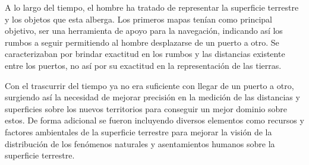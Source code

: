 A lo largo del tiempo, el hombre ha tratado de representar la superficie terrestre y los objetos que esta alberga.
Los primeros mapas tenían como principal objetivo, ser una herramienta de apoyo para la navegación, indicando así
los rumbos a seguir permitiendo al hombre desplazarse de un puerto a otro. Se caracterizaban por brindar exactitud
en los rumbos y las distancias existente entre los puertos, no así por su exactitud en la representación de las
tierras. 

Con el trascurrir del tiempo ya no era suficiente con llegar de un puerto a otro, surgiendo así la
necesidad de mejorar precisión en la medición de las distancias y superficies sobre los nuevos territorios para
conseguir un mejor dominio sobre estos. De forma adicional se fueron incluyendo diversos elementos como recursos y
factores ambientales de la superficie terrestre para mejorar la visión de la distribución de los fenómenos
naturales y asentamientos humanos sobre la superficie terrestre.
